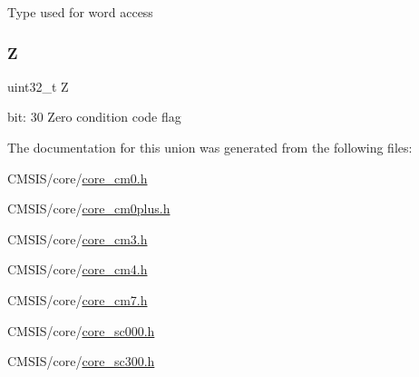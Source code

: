 Type used for word access \mbox{\label{union_a_p_s_r___type_a5ae954cbd9986cd64625d7fa00943c8e}} 
\subsubsection{\texorpdfstring{Z}{Z}}
{\footnotesize\ttfamily uint32\+\_\+t Z}

bit\+: 30 Zero condition code flag 

The documentation for this union was generated from the following files\+:\begin{DoxyCompactItemize}
\item 
C\+M\+S\+I\+S/core/\hyperlink{core__cm0_8h}{core\+\_\+cm0.\+h}\item 
C\+M\+S\+I\+S/core/\hyperlink{core__cm0plus_8h}{core\+\_\+cm0plus.\+h}\item 
C\+M\+S\+I\+S/core/\hyperlink{core__cm3_8h}{core\+\_\+cm3.\+h}\item 
C\+M\+S\+I\+S/core/\hyperlink{core__cm4_8h}{core\+\_\+cm4.\+h}\item 
C\+M\+S\+I\+S/core/\hyperlink{core__cm7_8h}{core\+\_\+cm7.\+h}\item 
C\+M\+S\+I\+S/core/\hyperlink{core__sc000_8h}{core\+\_\+sc000.\+h}\item 
C\+M\+S\+I\+S/core/\hyperlink{core__sc300_8h}{core\+\_\+sc300.\+h}\end{DoxyCompactItemize}
